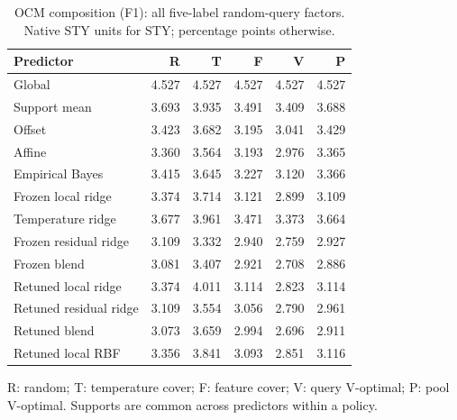 \begin{table}[htbp]\centering\small
\caption{OCM composition (F1): all five-label random-query factors. Native STY units for STY; percentage points otherwise.}
\begin{tabular}{lrrrrr}\toprule Predictor & R & T & F & V & P\\\midrule
Global & 4.527 & 4.527 & 4.527 & 4.527 & 4.527\\
Support mean & 3.693 & 3.935 & 3.491 & 3.409 & 3.688\\
Offset & 3.423 & 3.682 & 3.195 & 3.041 & 3.429\\
Affine & 3.360 & 3.564 & 3.193 & 2.976 & 3.365\\
Empirical Bayes & 3.415 & 3.645 & 3.227 & 3.120 & 3.366\\
Frozen local ridge & 3.374 & 3.714 & 3.121 & 2.899 & 3.109\\
Temperature ridge & 3.677 & 3.961 & 3.471 & 3.373 & 3.664\\
Frozen residual ridge & 3.109 & 3.332 & 2.940 & 2.759 & 2.927\\
Frozen blend & 3.081 & 3.407 & 2.921 & 2.708 & 2.886\\
Retuned local ridge & 3.374 & 4.011 & 3.114 & 2.823 & 3.114\\
Retuned residual ridge & 3.109 & 3.554 & 3.056 & 2.790 & 2.961\\
Retuned blend & 3.073 & 3.659 & 2.994 & 2.696 & 2.911\\
Retuned local RBF & 3.356 & 3.841 & 3.093 & 2.851 & 3.116\\
\bottomrule\end{tabular}\par\smallskip\footnotesize R: random; T: temperature cover; F: feature cover; V: query V-optimal; P: pool V-optimal. Supports are common across predictors within a policy.\end{table}\FloatBarrier
